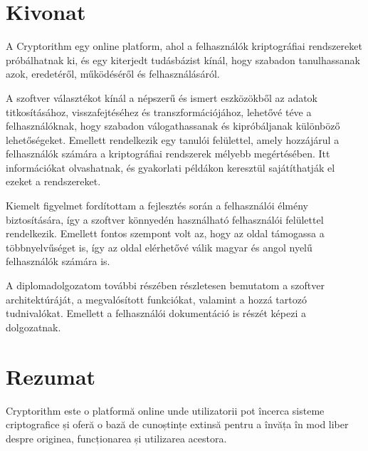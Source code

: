 
\hungarianParagraph


\chapter*{Kivonat}

A Cryptorithm egy online platform, ahol a felhasználók kriptográfiai rendszereket próbálhatnak ki, és egy kiterjedt tudásbázist kínál, hogy szabadon tanulhassanak azok, eredetéről, működéséről és felhasználásáról.

A szoftver választékot kínál a népszerű és ismert eszközökből az adatok titkosításához, visszafejtéséhez és transzformációjához, lehetővé téve a felhasználóknak, hogy szabadon válogathassanak és kipróbáljanak különböző lehetőségeket. Emellett rendelkezik egy tanulói felülettel, amely hozzájárul a felhasználók számára a kriptográfiai rendszerek mélyebb megértésében. Itt információkat olvashatnak, és gyakorlati példákon keresztül sajátíthatják el ezeket a rendszereket. 

Kiemelt figyelmet fordítottam a fejlesztés során a felhasználói élmény biztosítására, így a szoftver könnyedén használható felhasználói felülettel rendelkezik. Emellett fontos szempont volt az, hogy az oldal támogassa a többnyelvűséget is, így az oldal elérhetővé válik magyar és angol nyelű felhasználók számára is.

A diplomadolgozatom további részében részletesen bemutatom a szoftver architektúráját, a megvalósított funkciókat, valamint a hozzá tartozó tudnivalókat. Emellett a felhasználói dokumentáció is részét képezi a dolgozatnak.


\vfill
{}

\chapter*{Rezumat}

Cryptorithm este o platformă online unde utilizatorii pot încerca sisteme criptografice și oferă o bază de cunoștințe extinsă pentru a învăța în mod liber despre originea, funcționarea și utilizarea acestora.


